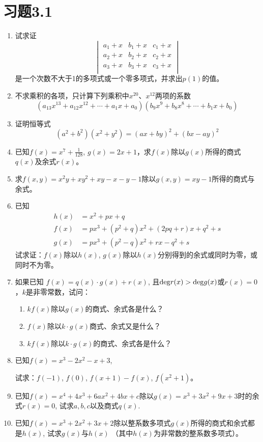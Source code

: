 \section*{习题3.1}
\begin{enumerate}
    \item 试求证
\[\begin{vmatrix}
    a_1+x &  b_1+x  &  c_1+x\\
    a_2+x &  b_2+x  &  c_2+x\\
    a_3+x &  b_3+x  &  c_3+x\\
\end{vmatrix}\]
是一个次数不大于1的多项式或一个零多项式，并求出$p(1)$的值。

\item 不求乘积的各项，只计算下列乘积中$x^{20}$、$x^{12}$两项的系数
\[(a_{13}x^{13}+a_{12}x^{12}+\cdots +a_{1}x+a_0)(b_9x^9+b_8x^8+\cdots +b_1x+b_0)\]
\item 证明恒等式
\[(a^2+b^2)(x^2+y^2)=(ax+by)^2+(bx-ay)^2\]

\item 已知$f(x)=x^7+\frac{1}{128}$, $g(x)=2x+1$，求$f(x)$除以$g(x)$所得的商式$q(x)$及余式$r(x)$。

\item 求$f(x,y)=x^2y+xy^2+xy-x-y-1$除以$g(x,y)=xy-1$所得的商式与余式。
\item 已知
\[\begin{split}
h(x)&=x^2+px+q\\
f(x)&=px^3+(p^2+q)x^2+(2pq+r)x+q^2+s\\
g(x)&=px^3+(p^2-q)x^2+rx-q^2+s
\end{split}\]
试求证：$f(x)$除以$h(x)$, $g(x)$除以$h(x)$分别得到的余式或同时为零，或同时不为零。

\item 如果已知
$f(x)=q(x)\cdot g(x)+r(x)$, 且${\rm deg}r(x)>{\rm deg}g(x)$或$r(x)=0$，$k$是非零常数，试问：
\begin{enumerate}
    \item $kf(x)$除以$g(x)$的商式、余式各是什么？
    \item $f(x)$除以$k\cdot g(x)$商式、余式又是什么？
    \item  $kf(x)$除以$k\cdot g(x)$的商式、余式各是什么？    
\end{enumerate}


\item 已知$f(x)=x^3-2x^2-x+3$, 

试求：$f(-1)$, $f(0)$, $f (x+1) -f (x)$, $f (x^2+1)$。

\item 已知$f(x)=x^4+4x^3+6ax^2+4bx+c$除以$g(x)=x^3+3x^2+9x+3$时的余式$r(x)=0$, 试求$a,b,c$以及商式$q(x)$.

\item 已知$f(x)=x^3+2x^2+3x+2$除以整系数多项式$g(x)$所得的商式和余式都是$h(x)$, 试求$g(x)$与$h(x)$ （其中$h(x)$为非常数的整系数多项式）。
\end{enumerate}

